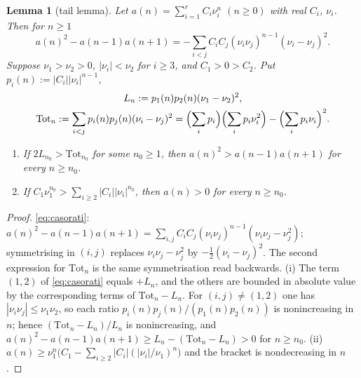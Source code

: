 \documentclass[11pt,a4paper]{article}
\newtheorem{lemma}[theorem]{Lemma}
\theoremstyle{definition}
\begin{document}
\begin{lemma}[tail lemma]\label{lem:tail1d}
Let $a(n)=\sum_{i=1}^rC_i\nu_i^n$ $(n\ge0)$ with real $C_i$, $\nu_i$. Then for $n\ge1$
\begin{equation}\label{eq:casorati}
a(n)^2-a(n-1)a(n+1)=-\sum_{i<j}C_iC_j(\nu_i\nu_j)^{n-1}(\nu_i-\nu_j)^2 .
\end{equation}
Suppose $\nu_1>\nu_2>0$, $|\nu_i|<\nu_2$ for $i\ge3$, and $C_1>0>C_2$. Put $p_i(n):=|C_i||\nu_i|^{n-1}$,
\begin{gather*}
L_n:=p_1(n)p_2(n)(\nu_1-\nu_2)^2,\\
\mathrm{Tot}_n:=\sum_{i<j}p_i(n)p_j(n)(\nu_i-\nu_j)^2=\Bigl(\sum_ip_i\Bigr)\Bigl(\sum_ip_i\nu_i^2\Bigr)-\Bigl(\sum_ip_i\nu_i\Bigr)^2 .
\end{gather*}
\begin{enumerate}
\item[(i)] If $2L_{n_0}>\mathrm{Tot}_{n_0}$ for some $n_0\ge1$, then $a(n)^2>a(n-1)a(n+1)$ for every $n\ge n_0$.
\item[(ii)] If $C_1\nu_1^{n_0}>\sum_{i\ge2}|C_i||\nu_i|^{n_0}$, then $a(n)>0$ for every $n\ge n_0$.
\end{enumerate}
\end{lemma}
\begin{proof}
\eqref{eq:casorati}: $a(n)^2-a(n-1)a(n+1)=\sum_{i,j}C_iC_j(\nu_i\nu_j)^{n-1}(\nu_i\nu_j-\nu_j^2)$; symmetrising in $(i,j)$ replaces $\nu_i\nu_j-\nu_j^2$ by $-\frac12(\nu_i-\nu_j)^2$. The second expression for $\mathrm{Tot}_n$ is the same symmetrisation read backwards. (i) The term $(1,2)$ of \eqref{eq:casorati} equals $+L_n$, and the others are bounded in absolute value by the corresponding terms of $\mathrm{Tot}_n-L_n$. For $(i,j)\ne(1,2)$ one has $|\nu_i\nu_j|\le\nu_1\nu_2$, so each ratio $p_i(n)p_j(n)/(p_1(n)p_2(n))$ is nonincreasing in $n$; hence $(\mathrm{Tot}_n-L_n)/L_n$ is nonincreasing, and $a(n)^2-a(n-1)a(n+1)\ge L_n-(\mathrm{Tot}_n-L_n)>0$ for $n\ge n_0$. (ii) $a(n)\ge\nu_1^n\bigl(C_1-\sum_{i\ge2}|C_i|(|\nu_i|/\nu_1)^n\bigr)$ and the bracket is nondecreasing in $n$.
\end{proof}
\end{document}
